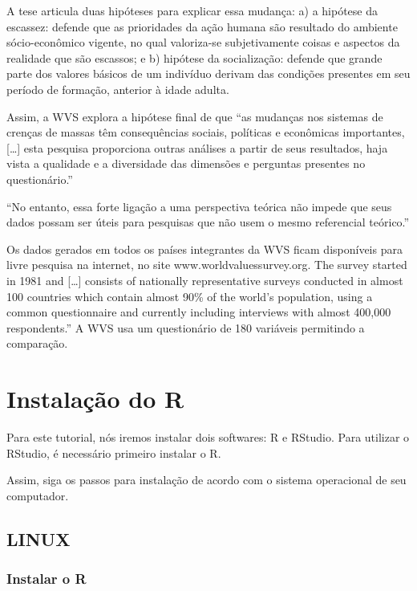 \documentclass[
]{book}
\begin{document}
A tese articula duas hipóteses para explicar essa mudança: a) a hipótese da escassez: defende que as prioridades da ação humana são resultado do ambiente sócio-econômico vigente, no qual valoriza-se subjetivamente coisas e aspectos da realidade que são escassos; e b) hipótese da socialização: defende que grande parte dos valores básicos de um indivíduo derivam das condições presentes em seu período de formação, anterior à idade adulta.

Assim, a WVS explora a hipótese final de que ``as mudanças nos sistemas de crenças de massas têm consequências sociais, políticas e econômicas importantes, {[}\ldots{]} esta pesquisa proporciona outras análises a partir de seus resultados, haja vista a qualidade e a diversidade das dimensões e perguntas presentes no questionário.'' \citep{castro_conteudo_2015}

``No entanto, essa forte ligação a uma perspectiva teórica não impede que seus dados possam ser úteis para pesquisas que não usem o mesmo referencial teórico.'' \citep{castro_conteudo_2015}

Os dados gerados em todos os países integrantes da WVS ficam disponíveis para livre pesquisa na internet, no site www.worldvaluessurvey.org. The survey started in 1981 and {[}\ldots{]} consists of nationally representative surveys conducted in almost 100 countries which contain almost 90\% of the world's population, using a common questionnaire and currently including interviews with almost 400,000 respondents.'' A WVS usa um questionário de 180 variáveis permitindo a comparação.

\hypertarget{instalauxe7uxe3o-do-r}{%
\chapter{Instalação do R}\label{instalauxe7uxe3o-do-r}}

Para este tutorial, nós iremos instalar dois softwares: R e RStudio. Para utilizar o RStudio, é necessário primeiro instalar o R.

Assim, siga os passos para instalação de acordo com o sistema operacional de seu computador.

\hypertarget{linux}{%
\section{LINUX}\label{linux}}

\hypertarget{instalar-o-r}{%
\subsection{Instalar o R}\label{instalar-o-r}}
\end{document}
